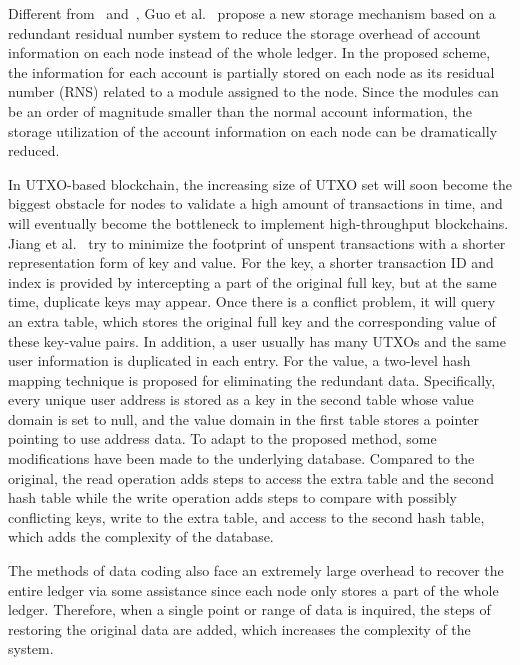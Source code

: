\documentclass[acmsmall]{acmart}
\begin{document}
Different from~\cite{perard2018erasure} and~\cite{dai2018low}, Guo et al.~\cite{guo2019design} propose a new storage mechanism based on a redundant residual number system to reduce the storage overhead of account information on each node instead of the whole ledger. In the proposed scheme, the information for each account is partially stored on each node as its residual number (RNS) related to a module assigned to the node. Since the modules can be an order of magnitude smaller than the normal account information, the storage utilization of the account information on each node can be dramatically reduced.


In UTXO-based blockchain, the increasing size of UTXO set will soon become the biggest obstacle for nodes to validate a high amount of transactions in time, and will eventually become the bottleneck to implement high-throughput blockchains. Jiang et al.~\cite{DBLP:journals/jsa/JiangLGYYSL20} try to minimize the footprint of unspent transactions with a shorter representation form of key and value. For the key, a shorter transaction ID and index is provided by intercepting a part of the original full key, but at the same time, duplicate keys may appear. Once there is a conflict problem, it will query an extra table, which stores the original full key and the corresponding value of these key-value pairs. In addition, a user usually has many UTXOs and the same user information is duplicated in each entry. For the value, a two-level hash mapping technique is proposed for eliminating the redundant data. Specifically, every unique user address is stored as a key in the second table whose value domain is set to null, and the value domain in the first table stores a pointer pointing to use address data. To adapt to the proposed method, some modifications have been made to the underlying database. Compared to the original, the read operation adds steps to access the extra table and the second hash table while the write operation adds steps to compare with possibly conflicting keys, write to the extra table, and access to the second hash table, which adds the complexity of the database.



The methods of data coding also face an extremely large overhead to recover the entire ledger via some assistance since each node only stores a part of the whole ledger. Therefore, when a single point or range of data is inquired, the steps of restoring the original data are added, which increases the complexity of the system.
\end{document}
